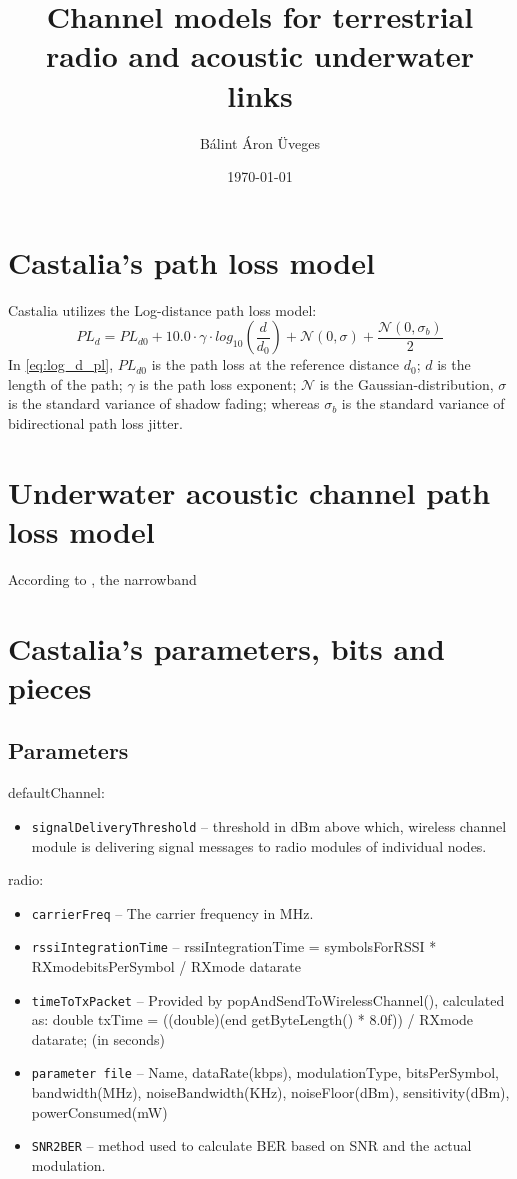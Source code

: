 \documentclass[a4paper]{article}
\title{Channel models for terrestrial radio and acoustic underwater links}
\author{Bálint Áron Üveges}
\date{\today}
\begin{document}
\maketitle

\section{Castalia's path loss model}
Castalia utilizes the Log-distance path loss model:
\begin{equation}
    PL_{d} = PL_{d0} + 10.0 \cdot \gamma \cdot log_{10} \left( \frac{d}{d_0} \right) +  \mathcal{N}(0,\sigma) + \frac{\mathcal{N}(0,\sigma_{b})}{2}
\label{eq:log_d_pl}
\end{equation}
In \eqref{eq:log_d_pl}, $PL_{d0}$ is the path loss at the reference distance $d_{0}$; $d$ is the length of the path; $\gamma$ is the path loss exponent; $\mathcal{N}$ is the Gaussian-distribution, $\sigma$ is the standard variance of shadow fading; whereas $\sigma_{b}$ is the standard variance of bidirectional path loss jitter.

\section{Underwater acoustic channel path loss model}
According to \cite{Stojanovic_2007}, the narrowband 

\section{Castalia's parameters, bits and pieces}
\subsection{Parameters}
defaultChannel:
\begin{itemize}
    \item \texttt{signalDeliveryThreshold} -- threshold in dBm above which, wireless channel module is delivering signal messages to radio modules of individual nodes.
\end{itemize}

radio:
\begin{itemize}
    \item \texttt{carrierFreq} -- The carrier frequency in MHz.
    \item \texttt{rssiIntegrationTime} -- rssiIntegrationTime = symbolsForRSSI * RXmode\textrightarrow bitsPerSymbol / RXmode \textrightarrow datarate
    \item \texttt{timeToTxPacket} -- Provided by popAndSendToWirelessChannel(), calculated as: double txTime = ((double)(end \textrightarrow getByteLength() * 8.0f)) / RXmode \textrightarrow datarate; (in seconds)
    \item \texttt{parameter file} -- Name, dataRate(kbps), modulationType, bitsPerSymbol, bandwidth(MHz), noiseBandwidth(KHz), noiseFloor(dBm), sensitivity(dBm), powerConsumed(mW)
    \item \texttt{SNR2BER} -- method used to calculate BER based on SNR and the actual modulation.
\end{itemize}
\end{document}
